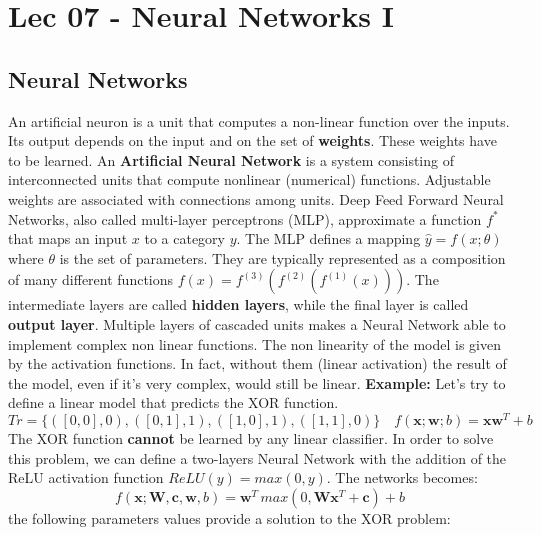 \chapter{Lec 07 - Neural Networks I}

\section{Neural Networks}
An artificial neuron is a unit that computes a non-linear function over the inputs. Its output depends on the input and on the set of \textbf{weights}. These weights have to be learned.\newline\newline
An \textbf{Artificial Neural Network} is a system consisting of interconnected units that compute nonlinear (numerical) functions. Adjustable weights are associated with connections among units.\newline\newline
Deep Feed Forward Neural Networks, also called multi-layer perceptrons (MLP), approximate a function $f^{*}$ that maps an input $x$ to a category $y$. The MLP defines a mapping $\hat{y} = f(x;\theta)$ where $\theta$ is the set of parameters. They are typically represented as a composition of many different functions $f(x) = f^{(3)}(f^{(2)}(f^{(1)}(x)))$. The intermediate layers are called \textbf{hidden layers}, while the final layer is called \textbf{output layer}.\newline\newline
Multiple layers of cascaded units makes a Neural Network able to implement complex non linear functions. The non linearity of the model is given by the activation functions. In fact, without them (linear activation) the result of the model, even if it’s very complex, would still be linear.\newline\newline
\textbf{Example:}\newline
Let's try to define a linear model that predicts the XOR function.
\[Tr = \{ ([0,0], 0), ([0, 1], 1), ([1,0],1), ([1,1], 0)\} \quad f(\textbf{x};\textbf{w};b) = \textbf{x}\textbf{w}^{T} + b\]
The XOR function \textbf{cannot} be learned by any linear classifier. In order to solve this problem, we can define a two-layers Neural Network with the addition of the ReLU activation function $ReLU(y) = max(0, y)$. The networks becomes:
\[f(\textbf{x}; \textbf{W}, \textbf{c}, \textbf{w}, b) = \textbf{w}^{T} \, max(0, \textbf{W}\textbf{x}^{T} + \textbf{c}) + b\]
the following parameters values provide a solution to the XOR problem:
